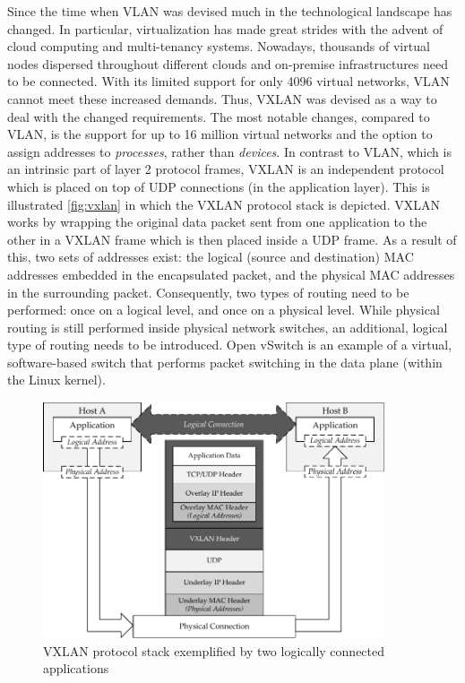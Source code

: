 Since the time when VLAN was devised much in the technological landscape has changed. In particular, virtualization has made great strides with the advent of cloud computing and multi-tenancy systems. Nowadays, thousands of virtual nodes dispersed throughout different clouds and on-premise infrastructures need to be connected. With its limited support for only 4096 virtual networks, VLAN cannot meet these increased demands. Thus, VXLAN was devised as a way to deal with the changed requirements. 
The most notable changes, compared to VLAN, is the support for up to 16 million virtual networks and the option to assign addresses to \emph{processes}, rather than \emph{devices}.
In contrast to VLAN, which is an intrinsic part of layer 2 protocol frames, VXLAN is an independent protocol which is placed on top of UDP connections (in the application layer). This is illustrated \autoref{fig:vxlan} in which the VXLAN protocol stack is depicted. VXLAN works by wrapping the original data packet sent from one application to the other in a VXLAN frame which is then placed inside a UDP frame. As a result of this, two sets of addresses exist: the logical (source and destination) MAC addresses embedded in the encapsulated packet, and the physical MAC addresses in the surrounding packet. 
Consequently, two types of routing need to be performed: once on a logical level, and once on a physical level. While physical routing is still performed inside physical network switches, an additional, logical type of routing needs to be introduced. Open vSwitch \cite{pfaff2015design} is an example of a virtual, software-based switch that performs packet switching in the data plane (within the Linux kernel).

\begin{figure}[htpb]
  \centering
  \includegraphics[width=0.9\textwidth]{figures/vxlan.pdf}
  \caption[VXLAN protocol stack]{VXLAN protocol stack exemplified by two logically connected applications}\label{fig:vxlan}
\end{figure}

